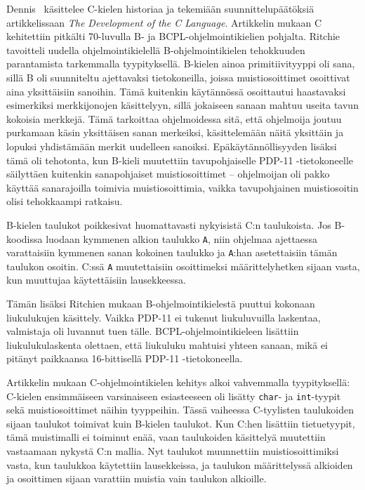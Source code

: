 Dennis~\citet{chistory} käsittelee C-kielen historiaa ja tekemiään
suunnittelupäätöksiä artikkelissaan \emph{The Development of the C Language}.
Artikkelin mukaan C kehitettiin pitkälti 70-luvulla B- ja
BCPL-ohjelmointikielien pohjalta. Ritchie tavoitteli uudella
ohjelmointikielellä B-ohjelmointikielen tehokkuuden parantamista tarkemmalla
tyypityksellä. B-kielen ainoa primitiivityyppi oli sana, sillä B oli suunniteltu ajettavaksi
tietokoneilla, joissa muistiosoittimet osoittivat aina yksittäisiin sanoihin.
Tämä kuitenkin käytännössä osoittautui haastavaksi esimerkiksi merkkijonojen
käsittelyyn, sillä jokaiseen sanaan mahtuu useita tavun kokoisia merkkejä. Tämä
tarkoittaa ohjelmoidessa sitä, että ohjelmoija joutuu purkamaan käsin
yksittäisen sanan merkeiksi, käsittelemään näitä yksittäin ja lopuksi
yhdistämään merkit uudelleen sanoiksi. Epäkäytännöllisyyden lisäksi tämä oli
tehotonta, kun B-kieli muutettiin tavupohjaiselle PDP-11 -tietokoneelle
säilyttäen kuitenkin sanapohjaiset muistiosoittimet -- ohjelmoijan oli pakko
käyttää sanarajoilla toimivia muistiosoittimia, vaikka tavupohjainen
muistiosoitin olisi tehokkaampi ratkaisu.

B-kielen taulukot poikkesivat huomattavasti nykyisistä C:n taulukoista. Jos
B\hyp{}koodissa luodaan kymmenen alkion taulukko \texttt{A}, niin ohjelmaa
ajettaessa varattaisiin kymmenen sanan kokoinen taulukko ja \texttt{A}:han
asetettaisiin tämän taulukon osoitin. C:ssä \texttt{A} muutettaisiin
osoittimeksi määrittelyhetken sijaan vasta, kun muuttujaa käytettäisiin
lausekkeessa.

Tämän lisäksi Ritchien mukaan B-ohjelmointikielestä puuttui kokonaan
liukulukujen käsittely. Vaikka PDP-11 ei tukenut liukuluvuilla laskentaa,
valmistaja oli luvannut tuen tälle. BCPL-ohjelmointikieleen lisättiin
liukulukulaskenta olettaen, että liukuluku mahtuisi yhteen sanaan, mikä ei
pitänyt paikkaansa 16-bittisellä PDP-11 -tietokoneella.

\grayrule

Artikkelin mukaan C-ohjelmointikielen kehitys alkoi vahvemmalla tyypityksellä:
C-kielen ensimmäiseen varsinaiseen esiasteeseen oli lisätty \texttt{char}- ja
\texttt{int}-tyypit sekä muistiosoittimet näihin tyyppeihin. Tässä vaiheessa
C-tyylisten taulukoiden sijaan taulukot toimivat kuin B-kielen taulukot. Kun
C:hen lisättiin tietuetyypit, tämä muistimalli ei toiminut enää, vaan
taulukoiden käsittelyä muutettiin vastaamaan nykystä C:n mallia. Nyt taulukot
muunnettiin muistiosoittimiksi vasta, kun taulukkoa käytettiin lausekkeissa, ja
taulukon määrittelyssä alkioiden ja osoittimen sijaan varattiin muistia vain
taulukon alkioille.

